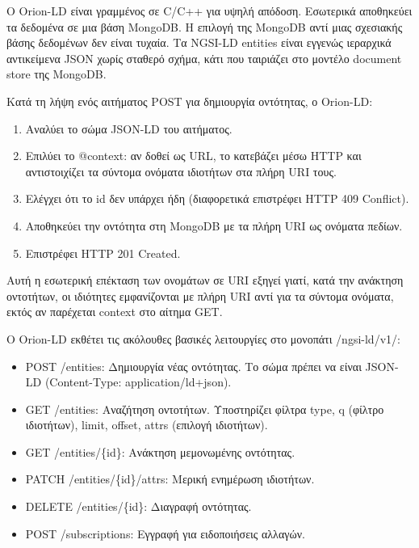 Ο \textlatin{Orion-LD} είναι γραμμένος σε \textlatin{C/C++} για υψηλή
απόδοση. Εσωτερικά αποθηκεύει τα δεδομένα σε μια βάση
\textlatin{MongoDB}. Η επιλογή της \textlatin{MongoDB} 
αντί μιας σχεσιακής βάσης δεδομένων δεν είναι τυχαία. Τα
\textlatin{NGSI-LD entities} είναι εγγενώς ιεραρχικά αντικείμενα
\textlatin{JSON} χωρίς σταθερό σχήμα, κάτι που ταιριάζει στο μοντέλο
\textlatin{document store} της \textlatin{MongoDB}.

Κατά τη λήψη ενός αιτήματος \textlatin{POST} για δημιουργία οντότητας,
ο \textlatin{Orion-LD}:
\begin{enumerate}
    \item Αναλύει το σώμα \textlatin{JSON-LD} του αιτήματος.
    \item Επιλύει το \textlatin{@context}: αν δοθεί ως \textlatin{URL},
    το κατεβάζει μέσω \textlatin{HTTP} και αντιστοιχίζει τα σύντομα
    ονόματα ιδιοτήτων στα πλήρη \textlatin{URI} τους.
    \item Ελέγχει ότι το \textlatin{id} δεν υπάρχει ήδη (διαφορετικά
    επιστρέφει \textlatin{HTTP 409 Conflict}).
    \item Αποθηκεύει την οντότητα στη \textlatin{MongoDB} με τα πλήρη
    \textlatin{URI} ως ονόματα πεδίων.
    \item Επιστρέφει \textlatin{HTTP 201 Created}.
\end{enumerate}

Αυτή η εσωτερική επέκταση των ονομάτων σε
\textlatin{URI} εξηγεί γιατί, κατά την ανάκτηση οντοτήτων, οι ιδιότητες
εμφανίζονται με πλήρη \textlatin{URI} αντί για τα
σύντομα ονόματα,  εκτός αν παρέχεται
\textlatin{context} στο αίτημα \textlatin{GET}.

Ο \textlatin{Orion-LD} εκθέτει τις ακόλουθες βασικές λειτουργίες στο
μονοπάτι \textlatin{/ngsi-ld/v1/}:

\begin{itemize}
    \item \textlatin{POST /entities}: Δημιουργία νέας οντότητας. Το σώμα
    πρέπει να είναι \textlatin{JSON-LD} (\textlatin{Content-Type:
    application/ld+json}).
    \item \textlatin{GET /entities}: Αναζήτηση οντοτήτων. Υποστηρίζει
    φίλτρα \textlatin{type}, \textlatin{q} (φίλτρο ιδιοτήτων), \textlatin{limit},
    \textlatin{offset}, \textlatin{attrs} (επιλογή ιδιοτήτων).
    \item \textlatin{GET /entities/\{id\}}: Ανάκτηση μεμονωμένης οντότητας.
    \item \textlatin{PATCH /entities/\{id\}/attrs}: Μερική ενημέρωση
    ιδιοτήτων.
    \item \textlatin{DELETE /entities/\{id\}}: Διαγραφή οντότητας.
    \item \textlatin{POST /subscriptions}: Εγγραφή για ειδοποιήσεις
    αλλαγών.
\end{itemize}

